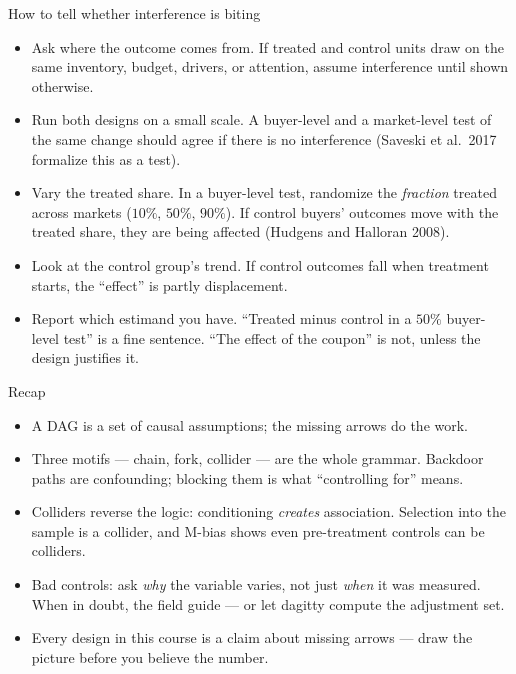 \documentclass[aspectratio=169,11pt]{beamer}
\begin{document}
\begin{frame}{How to tell whether interference is biting}
\begin{itemize}
	\item \alert{Ask where the outcome comes from.} If treated and control units draw on the same inventory,
	budget, drivers, or attention, assume interference until shown otherwise.
	\medskip
	\item \alert{Run both designs on a small scale.} A buyer-level and a market-level test of the same
	change should agree if there is no interference (Saveski et al.\ 2017 formalize this as a test).
	\medskip
	\item \alert{Vary the treated share.} In a buyer-level test, randomize the \emph{fraction} treated across
	markets ($10\%$, $50\%$, $90\%$). If control buyers' outcomes move with the treated share, they are being
	affected (Hudgens and Halloran 2008).
	\medskip
	\item \alert{Look at the control group's trend.} If control outcomes fall when treatment starts, the
	``effect'' is partly displacement.
	\medskip
	\item \alert{Report which estimand you have.} ``Treated minus control in a $50\%$ buyer-level test'' is a
	fine sentence. ``The effect of the coupon'' is not, unless the design justifies it.
\end{itemize}
\end{frame}



\begin{frame}{Recap}
\begin{itemize}
	\item A DAG is a set of causal assumptions; the missing arrows do the work.
	\item Three motifs --- chain, fork, collider --- are the whole grammar. Backdoor
	paths are confounding; blocking them is what ``controlling for'' means.
	\item Colliders reverse the logic: conditioning \emph{creates} association.
	Selection into the sample is a collider, and M-bias shows even pre-treatment
	controls can be colliders.
	\item Bad controls: ask \emph{why} the variable varies, not just \emph{when} it
	was measured. When in doubt, the field guide --- or let dagitty compute the
	adjustment set.
	\item Every design in this course is a claim about missing arrows --- draw the
	picture before you believe the number.
\end{itemize}
\end{frame}
\end{document}
